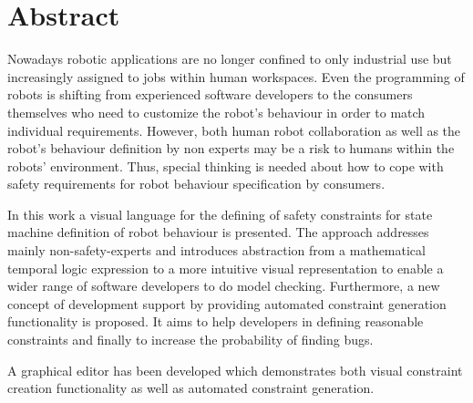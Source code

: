 \chapter*{Abstract}

Nowadays robotic applications are no longer confined to only industrial use but increasingly assigned to jobs within human workspaces. Even the programming of robots is shifting from experienced software developers to the consumers themselves who need to customize the robot's behaviour in order to match individual requirements.
However, both human robot collaboration as well as the robot's behaviour definition by non experts may be a risk to humans within the robots' environment.
Thus, special thinking is needed about how to cope with safety requirements for robot behaviour specification by consumers.

In this work a visual language for the defining of safety constraints for state machine definition of robot behaviour is presented. The approach addresses mainly non-safety-experts and introduces abstraction from a mathematical temporal logic expression to a more intuitive visual representation to enable a wider range of software developers to do model checking.
Furthermore, a new concept of development support by providing automated constraint generation functionality is proposed. It aims to help developers in defining reasonable constraints and finally to increase the probability of finding bugs.

A graphical editor has been developed which demonstrates both visual constraint creation functionality as well as automated constraint generation.